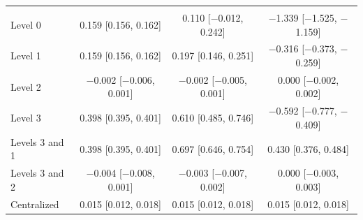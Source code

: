 \begin{tabular}{lccc}
\addlinespace
\multicolumn{4}{@{}l}{\textit{Heart, XGBoost}} \\
Level 0 & 0.159 [0.156, 0.162] & 0.110 [$-$0.012, 0.242] & $-$1.339 [$-$1.525, $-$1.159] \\
Level 1 & 0.159 [0.156, 0.162] & 0.197 [0.146, 0.251] & $-$0.316 [$-$0.373, $-$0.259] \\
Level 2 & $-$0.002 [$-$0.006, 0.001] & $-$0.002 [$-$0.005, 0.001] & 0.000 [$-$0.002, 0.002] \\
Level 3 & 0.398 [0.395, 0.401] & 0.610 [0.485, 0.746] & $-$0.592 [$-$0.777, $-$0.409] \\
Levels 3 and 1 & 0.398 [0.395, 0.401] & 0.697 [0.646, 0.754] & 0.430 [0.376, 0.484] \\
Levels 3 and 2 & $-$0.004 [$-$0.008, 0.001] & $-$0.003 [$-$0.007, 0.002] & 0.000 [$-$0.003, 0.003] \\
Centralized & 0.015 [0.012, 0.018] & 0.015 [0.012, 0.018] & 0.015 [0.012, 0.018] \\
\bottomrule
\end{tabular}
